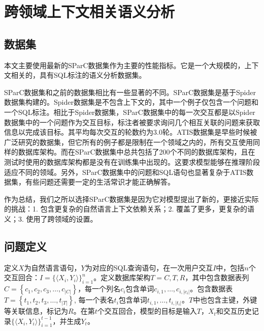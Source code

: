 \chapter{跨领域上下文相关语义分析}

\section{数据集} \label{dataset}

本文主要使用最新的SParC\cite{sparc19}数据集作为主要的性能指标。它是一个大规模的，上下文相关的，具有SQL标注的语义分析数据集。

SParC数据集和之前的数据集相比有一些显著的不同。SParC数据集是基于Spider\cite{spider18}数据集构建的。Spider数据集是不包含上下文的，其中一个例子仅包含一个问题和一个SQL标注。相比于Spider数据集，SParC数据集中的每一次交互都是以Spider数据集中的一个问题作为交互目标，标注者被要求询问几个相互关联的问题来获取信息以完成该目标。其平均每次交互的轮数约为3.0轮。ATIS数据集是早些时候被广泛研究的数据集，但它所有的例子都是限制在一个领域之内的，所有交互使用同样的数据库架构。而在SParC数据集中总共包括了200个不同的数据库架构，且在测试时使用的数据库架构都是没有在训练集中出现的。这要求模型能够在推理阶段适应不同的领域。另外，SParC数据集中的问题和SQL语句也显著复杂于ATIS数据集，有些问题还需要一定的生活常识才能正确解答。

作为总结，我们之所以选择SParC数据集是因为它对模型提出了新的，更接近实际的挑战：1. 包含更复杂的自然语言上下文依赖关系；2. 覆盖了更多，更复杂的语义；3. 使用了跨领域的设置。

\section{问题定义}

定义$X$为自然语言语句，$Y$为对应的SQL查询语句，在一次用户交互$I$中，包括$n$个交互回合：$I=\{\langle X_i,Y_i\rangle\}_{i=1}^n$。定义数据库架构$T=C,T,R$，其中包含数据表列$C=\left\{c_1,c_2,c_3,\ldots,c_{\left|C\right|}\right\}$，每一个列名$c_i$包含单词$c_{i,1},\ldots,c_{i,\left|c_i\right|}$。包含数据表$T=\left\{t_1,t_2,t_3,\ldots,t_{\left|T\right|}\right\}$, 每一个表名$t_i$包含单词$t_{i,1},\ldots,t_{i,\left|t_i\right|}$。$T$中也包含主键，外键等关联信息，标记为$R$。在第$t$个交互回合，模型的目标是输入$T$，$X_t$和交互历史记录$\{\langle X_i,Y_i\rangle\}_{i=1}^{t-1}$，并生成$Y_t$。
